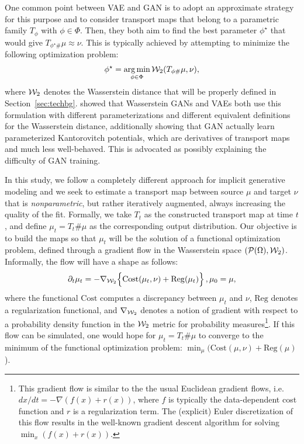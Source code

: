 One common point between VAE and GAN is to adopt an approximate strategy for this purpose and to consider transport maps that belong to a parametric family $T_{\phi}$ with $\phi \in \Phi$. Then, they both aim to find the best parameter $\phi^\star$ that would give $T_{\phi^\star \#}\mu \approx \nu$. This is typically achieved by attempting to minimize the following optimization problem:
\begin{align}
\phi^\star = \operatorname*{arg\min}_{\phi \in \Phi} {\cal W}_2(T_{\phi \#}\mu, \nu),
\end{align}
where ${\cal W}_2$ denotes the Wasserstein distance that will be properly defined in Section~\ref{sec:techbg}.  \cite{genevay2017gan} showed that Wasserstein GANs \cite{arjovsky2017wasserstein} and VAEs both use this formulation with different parameterizations and different equivalent definitions for the Wasserstein distance, additionally showing that GAN actually learn parameterized Kantorovitch potentials, which are derivatives of transport maps and much less well-behaved. This is advocated as possibly explaining the difficulty of GAN training.

In this study, we follow a completely different approach for implicit generative modeling and we seek to estimate a transport map between source $\mu$ and target $\nu$ that is \textit{nonparametric}, but rather iteratively augmented, always increasing the quality of the fit. Formally, we take $T_t$ as the constructed transport map at time $t$, and define $\mu_t=T_t \# \mu$ as the corresponding output distribution. Our objective is to build the maps so that $\mu_t$ will be the solution of a functional optimization problem, defined through a gradient flow in the Wasserstein space $({\cal P}(\Omega),{\cal W}_2)$. Informally, the flow will have a shape as follows:
\begin{align}
\partial_t \mu_t = - \nabla_{{\cal W}_2} \Bigl\{ \mathrm{Cost}(\mu_t, \nu) + \mathrm{Reg}(\mu_t)\Bigr\} \, , \mu_0 = \mu,\label{eqn:gradflow}
\end{align}
where the functional $\mathrm{Cost}$ computes a discrepancy between $\mu_t$ and $\nu$, $\mathrm{Reg}$ denotes a regularization functional, and $\nabla_{{\cal W}_2}$ denotes a notion of gradient with respect to a probability density function in the ${\cal W}_2$ metric for probability measures\footnote{This gradient flow is similar to the the usual Euclidean gradient flows, i.e.\ $dx/dt = - \nabla (f(x) + r(x))$, where $f$ is typically the data-dependent cost function and $r$ is a regularization term. The (explicit) Euler discretization of this flow results in the well-known gradient descent algorithm for solving $\min_x (f(x)+r(x))$.}. If this flow can be simulated, one would hope for $\mu_t=T_t\#\mu$ to converge to the minimum of the functional optimization problem: $\min_\mu ( \mathrm{Cost}(\mu, \nu) + \mathrm{Reg}(\mu)$).


